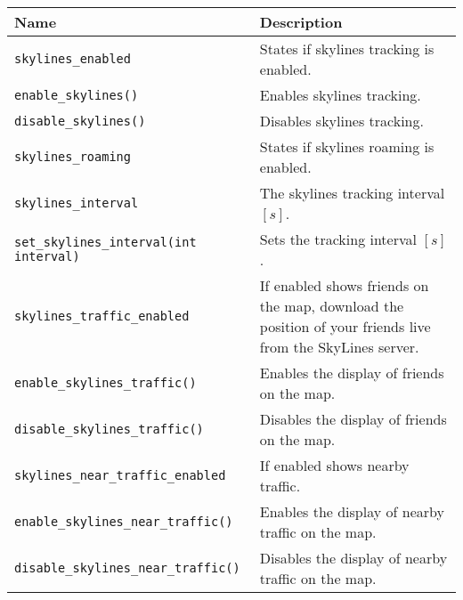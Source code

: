 \begin{maxipage}
\begin{tabularx}{1.9\textwidth}{l|X}
Name & Description \\
\hline\hline

\verb|skylines_enabled| & States if skylines tracking is enabled.\\

\hline

\verb|enable_skylines()| & Enables skylines tracking.\\

\hline

\verb|disable_skylines()| & Disables skylines tracking.\\

\hline

\verb|skylines_roaming| & States if skylines roaming is enabled.\\

\hline

\verb|skylines_interval| & The skylines tracking interval $[s]$.\\

\hline

\verb|set_skylines_interval(int interval)| & Sets the tracking interval $[s]$.\\

\hline

\verb|skylines_traffic_enabled| & If enabled shows friends on the map,
download the position \newline of your friends live from the SkyLines server.\\

\hline

\verb|enable_skylines_traffic()| & Enables the display of friends on the map.\\

\hline

\verb|disable_skylines_traffic()| & Disables the display of friends on the map.\\

\hline

\verb|skylines_near_traffic_enabled| & If enabled shows nearby traffic.\\

\hline

\verb|enable_skylines_near_traffic()| & Enables the display of nearby traffic on the map.\\

\hline

\verb|disable_skylines_near_traffic()| & Disables the display of nearby traffic on the map.\\


\end{tabularx}
\end{maxipage}
